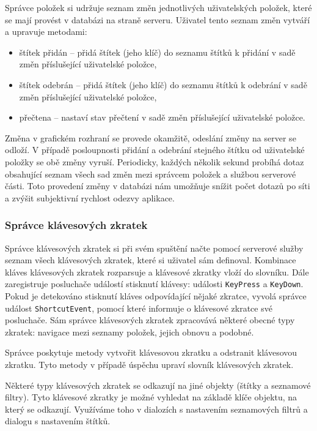 Správce položek si udržuje seznam změn jednotlivých uživatelských položek, které se mají provést v databázi na straně serveru.
Uživatel tento seznam změn vytváří a upravuje metodami:
\begin{itemize}
	\item štítek přidán -- přidá štítek (jeho klíč) do seznamu štítků k přidání v sadě změn příslušející uživatelské položce,
	\item štítek odebrán -- přidá štítek (jeho klíč) do seznamu štítků k odebrání v sadě změn příslušející uživatelské položce,
	\item přečtena -- nastaví stav přečtení v sadě změn příslušející uživatelské položce.
\end{itemize}

Změna v grafickém rozhraní se provede okamžitě, odeslání změny na server se odloží.
V případě posloupnosti přidání a odebrání stejného štítku od uživatelské položky se obě změny vyruší.
Periodicky, každých několik sekund probíhá dotaz obsahující seznam všech sad změn mezi správcem položek a službou serverové části.
Toto  provedení změny v databázi nám umožňuje snížit počet dotazů po síti a zvýšit subjektivní rychlost odezvy aplikace.

\subsubsection{Správce klávesových zkratek}

Správce klávesových zkratek si při svém spuštění načte pomocí serverové služby seznam všech klávesových zkratek, které si uživatel sám definoval.
Kombinace kláves klávesových zkratek rozparsuje a klávesové zkratky vloží do slovníku.
Dále zaregistruje posluchače událostí stisknutí klávesy: události \verb|KeyPress| a \verb|KeyDown|.
Pokud je detekováno stisknutí kláves odpovídající nějaké zkratce, vyvolá správce událost \verb|ShortcutEvent|, pomocí které informuje o klávesové zkratce své posluchače.
Sám správce klávesových zkratek zpracovává některé obecné typy zkratek: navigace mezi seznamy položek, jejich obnovu a podobné.

Správce poskytuje metody vytvořit klávesovou zkratku a odstranit klávesovou zkratku.
Tyto metody v případě úspěchu upraví slovník klávesových zkratek.

Některé typy klávesových zkratek se odkazují na jiné objekty (štítky a seznamové filtry).
Tyto klávesové zkratky je možné vyhledat na základě klíče objektu, na který se odkazují.
Využíváme toho v dialozích s nastavením seznamových filtrů a dialogu s nastavením štítků.

